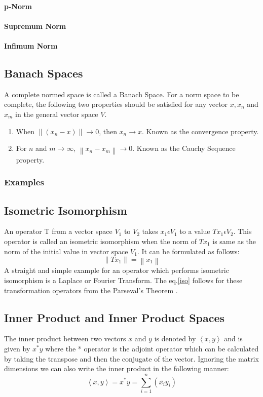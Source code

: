\documentclass[a4paper,12pt]{article}
\newcommand\norm[1]{\left\lVert#1\right\rVert}
\begin{document}
			\paragraph{p-Norm}
			\paragraph{Supremum Norm}
			\paragraph{Infimum Norm}
	\subsection{Banach Spaces}
	A complete normed space is called a Banach Space. For a norm space to be complete, the following two properties should be satisfied for any vector $x, x_{n}$ and $x_{m}$ in the general vector space $V$.
		\begin{enumerate}
			\item When $\norm{(x_{n} -x)}\rightarrow 0$, then $x_{n} \rightarrow x$. Known as the convergence property.
			\item For $n$ and $m \rightarrow \infty$, $\norm{x_{n}-x_{m}} \rightarrow 0$. Known as the Cauchy Sequence property.
		\end{enumerate}
		\subsubsection{Examples}
	\subsection{Isometric Isomorphism}
	An operator T from a vector space $V_{1}$ to $V_{2}$ takes $x_{1} \epsilon V_{1}$ to a value $Tx_{1} \epsilon V_{2}$. This operator is called an isometric isomorphism when the norm of $Tx_{1}$ is same as the norm of the initial value in vector space $V_{1}$. It can be formulated as follows:
		\begin{equation}
			\norm{Tx_{1}} = \norm{x_{1}}
			\label{iso}
		\end{equation}
	A straight and simple example for an operator which performs isometric isomorphism is a Laplace or Fourier Transform. The eq.\ref{iso} follows for these transformation operators from the Parseval's Theorem \cite{parseval}.
	\subsection{Inner Product and Inner Product Spaces} The inner product between two vectors $x$ and $y$ is denoted by $\left\langle x, y \right\rangle$ and is given by $x^{*}y$ where the * operator is the adjoint operator which can be calculated by taking the transpose and then the conjugate of the vector. Ignoring the matrix dimensions we can also write the inner product in the following manner:
		\begin{equation}
			\left\langle x, y \right\rangle = x^{*}y = \sum\limits_{i=1}^n (\bar{x_{i}}y_{i})
			\label{in}
		\end{equation}
		
\end{document}
